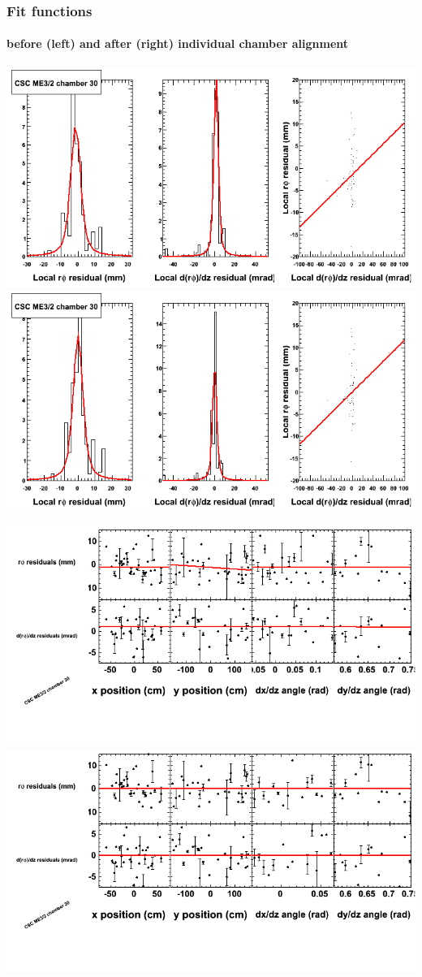 \documentclass[compress]{beamer}
\begin{document}
\begin{frame}
\frametitle{Fit functions}
\framesubtitle{before (left) and after (right) individual chamber alignment}
\includegraphics[width=0.5\linewidth]{ringfits_3dof/beforefit_MEp32_30_bellcurve.png} \includegraphics[width=0.5\linewidth]{ringfits_3dof/afterfit_MEp32_30_bellcurve.png}

\includegraphics[width=0.5\linewidth]{ringfits_3dof/beforefit_MEp32_30_polynomials.png} \includegraphics[width=0.5\linewidth]{ringfits_3dof/afterfit_MEp32_30_polynomials.png}
\end{frame}
\end{document}
